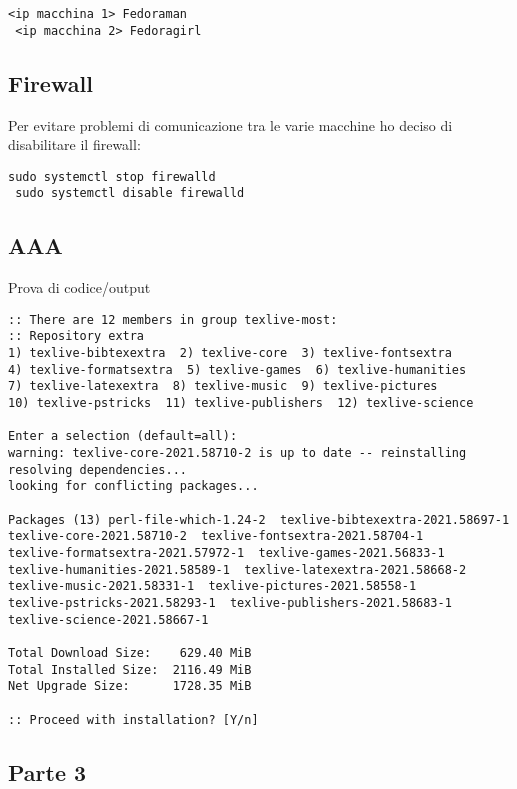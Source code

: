 \begin{lstlisting}[style=cmd]
 <ip macchina 1> Fedoraman
 <ip macchina 2> Fedoragirl
\end{lstlisting}

\subsection{Firewall}

Per evitare problemi di comunicazione tra le varie macchine ho deciso di disabilitare il firewall:

\begin{lstlisting}[style=cmd]
 sudo systemctl stop firewalld
 sudo systemctl disable firewalld
\end{lstlisting}

\subsection{AAA}

Prova di codice/output

\begin{lstlisting}[style=cmd]
:: There are 12 members in group texlive-most:
:: Repository extra
1) texlive-bibtexextra  2) texlive-core  3) texlive-fontsextra
4) texlive-formatsextra  5) texlive-games  6) texlive-humanities
7) texlive-latexextra  8) texlive-music  9) texlive-pictures
10) texlive-pstricks  11) texlive-publishers  12) texlive-science

Enter a selection (default=all): 
warning: texlive-core-2021.58710-2 is up to date -- reinstalling
resolving dependencies...
looking for conflicting packages...

Packages (13) perl-file-which-1.24-2  texlive-bibtexextra-2021.58697-1
texlive-core-2021.58710-2  texlive-fontsextra-2021.58704-1
texlive-formatsextra-2021.57972-1  texlive-games-2021.56833-1
texlive-humanities-2021.58589-1  texlive-latexextra-2021.58668-2
texlive-music-2021.58331-1  texlive-pictures-2021.58558-1
texlive-pstricks-2021.58293-1  texlive-publishers-2021.58683-1
texlive-science-2021.58667-1

Total Download Size:    629.40 MiB
Total Installed Size:  2116.49 MiB
Net Upgrade Size:      1728.35 MiB

:: Proceed with installation? [Y/n] 

\end{lstlisting}

\subsection{Parte 3}

